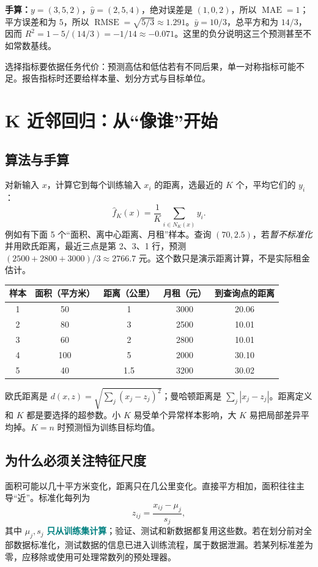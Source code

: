 \documentclass[UTF8,11pt,oneside]{ctexbook}
\newcommand{\key}[1]{\textcolor{teal}{\bfseries #1}}
\newcommand{\RMSE}{\operatorname{RMSE}}
\newcommand{\MAE}{\operatorname{MAE}}
\begin{document}
\textbf{手算：}$y=(3,5,2)$，$\hat y=(2,5,4)$，绝对误差是 $(1,0,2)$，所以 $\MAE=1$；平方误差和为 $5$，所以 $\RMSE=\sqrt{5/3}\approx1.291$。$\bar y=10/3$，总平方和为 $14/3$，因而 $R^2=1-5/(14/3)=-1/14\approx-0.071$。这里的负分说明这三个预测甚至不如常数基线。

选择指标要依据任务代价：预测高估和低估若有不同后果，单一对称指标可能不足。报告指标时还要给样本量、划分方式与目标单位。

\chapter{K 近邻回归：从“像谁”开始}
\section{算法与手算}
对新输入 $x$，计算它到每个训练输入 $x_i$ 的距离，选最近的 $K$ 个，平均它们的 $y_i$：
\[
\hat f_K(x)=\frac1K\sum_{i\in N_K(x)}y_i.
\]
例如有下面 5 个“面积、离中心距离、月租”样本。查询 $(70,2.5)$，若\emph{暂不标准化}并用欧氏距离，最近三点是第 2、3、1 行，预测 $(2500+2800+3000)/3\approx2766.7$ 元。这个数只是演示距离计算，不是实际租金估计。
\begin{center}\begin{tabular}{ccccc}\toprule
样本&面积（平方米）&距离（公里）&月租（元）&到查询点的距离\\\midrule
1&50&1&3000&20.06\\
2&80&3&2500&10.01\\
3&60&2&2800&10.01\\
4&100&5&2000&30.10\\
5&40&1.5&3200&30.02\\\bottomrule\end{tabular}\end{center}

欧氏距离是 $d(x,z)=\sqrt{\sum_j(x_j-z_j)^2}$；曼哈顿距离是 $\sum_j|x_j-z_j|$。距离定义和 $K$ 都是要选择的超参数。小 $K$ 易受单个异常样本影响，大 $K$ 易把局部差异平均掉。$K=n$ 时预测恒为训练目标均值。

\section{为什么必须关注特征尺度}
面积可能以几十平方米变化，距离只在几公里变化。直接平方相加，面积往往主导“近”。标准化每列为
\[
z_{ij}=\frac{x_{ij}-\mu_j}{s_j},
\]
其中 $\mu_j,s_j$ \key{只从训练集计算}；验证、测试和新数据都复用这些数。若在划分前对全部数据标准化，测试数据的信息已进入训练流程，属于数据泄漏。若某列标准差为零，应移除或使用可处理常数列的预处理器。
\end{document}
